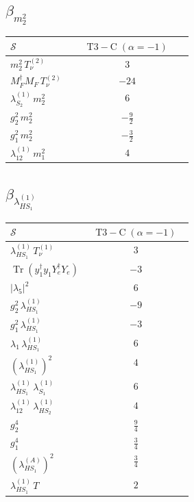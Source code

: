 \documentclass[9pt]{article}
\begin{document}
\subsection*{$ \beta_{m_2^{2}} $}
\begin{longtable}{@{}p{0.31\linewidth}c@{}}
\toprule
$\mathcal{S}$ & $ \mathrm{T3-C}\;(\alpha=-1) $ \\
\midrule
$ m_2^{2}\,T_{\nu}^{(2)} $ & $ 3 $ \\
$ M_F^\dagger M_F\,T_{\nu}^{(2)} $ & $ -24 $ \\
$ \lambda_{S_2}^{(1)}\,m_2^{2} $ & $ 6 $ \\
$ g_2^2\,m_2^{2} $ & $ - \frac{9}{2} $ \\
$ g_1^2\,m_2^{2} $ & $ - \frac{3}{2} $ \\
$ \lambda_{12}^{(1)}\,m_1^{2} $ & $ 4 $ \\
\bottomrule
\end{longtable}
\subsection*{$ \beta_{\lambda_{HS_1}^{(1)}} $}
\begin{longtable}{@{}p{0.31\linewidth}c@{}}
\toprule
$\mathcal{S}$ & $ \mathrm{T3-C}\;(\alpha=-1) $ \\
\midrule
$ \lambda_{HS_1}^{(1)}\,T_{\nu}^{(1)} $ & $ 3 $ \\
$ \operatorname{Tr}(y_1^\dagger y_1Y_e^\dagger Y_e) $ & $ -3 $ \\
$ |\lambda_5|^2 $ & $ 6 $ \\
$ g_2^2\,\lambda_{HS_1}^{(1)} $ & $ -9 $ \\
$ g_1^2\,\lambda_{HS_1}^{(1)} $ & $ -3 $ \\
$ \lambda_1\,\lambda_{HS_1}^{(1)} $ & $ 6 $ \\
$ \left(\lambda_{HS_1}^{(1)}\right)^2 $ & $ 4 $ \\
$ \lambda_{HS_1}^{(1)}\,\lambda_{S_1}^{(1)} $ & $ 6 $ \\
$ \lambda_{12}^{(1)}\,\lambda_{HS_2}^{(1)} $ & $ 4 $ \\
$ g_2^4 $ & $ \frac{9}{4} $ \\
$ g_1^4 $ & $ \frac{3}{4} $ \\
$ \left(\lambda_{HS_1}^{(A)}\right)^2 $ & $ \frac{3}{4} $ \\
$ \lambda_{HS_1}^{(1)}\,T $ & $ 2 $ \\
\bottomrule
\end{longtable}
\end{document}
